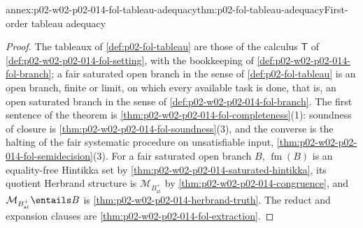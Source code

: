 \begin{annexitem}{annex:p02-w02-p02-014-fol-tableau-adequacy}{thm:p02-fol-tableau-adequacy}{First-order tableau adequacy}
\begin{proof}
The tableaux of \cref{def:p02-fol-tableau} are those of the calculus
\(\mathsf T\) of \cref{def:p02-w02-p02-014-fol-setting}, with the bookkeeping
of \cref{def:p02-w02-p02-014-fol-branch}; a fair saturated open branch in
the sense of \cref{def:p02-fol-tableau} is an open branch, finite or
limit, on which every available task is done, that is, an open saturated
branch in the sense of \cref{def:p02-w02-p02-014-fol-branch}.  The first
sentence of the theorem is \cref{thm:p02-w02-p02-014-fol-completeness}(1):
soundness of closure is \cref{thm:p02-w02-p02-014-fol-soundness}(3), and
the converse is the halting of the fair systematic procedure on
unsatisfiable input, \cref{thm:p02-w02-p02-014-fol-semidecision}(3).  For a
fair saturated open branch \(B\), \(\operatorname{fm}(B)\) is an equality-free
Hintikka set by \cref{thm:p02-w02-p02-014-saturated-hintikka}, its quotient
Herbrand structure is \(\mathcal M_{B^{+}_{\mathrm{at}}}\) by
\cref{thm:p02-w02-p02-014-congruence}, and
\(\mathcal M_{B^{+}_{\mathrm{at}}}\entails B\) is
\cref{thm:p02-w02-p02-014-herbrand-truth}.  The reduct and expansion
clauses are \cref{thm:p02-w02-p02-014-fol-extraction}.
\end{proof}
\end{annexitem}
